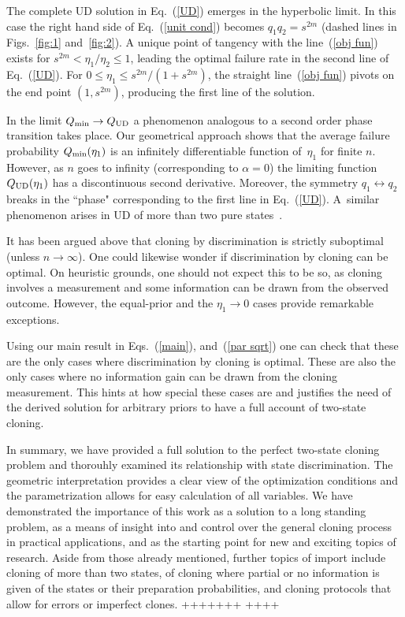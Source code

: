 \documentclass[aps,prl,twocolumn,showpacs]{revtex4}
\begin{document}
The complete UD solution in Eq.~(\ref{UD}) emerges in the hyperbolic limit. In this case the right hand side of Eq.~(\ref{unit cond}) becomes $q_1 q_2=s^{2m}$ (dashed lines in Figs.~\ref{fig:1} and~\ref{fig:2}).  A unique point of tangency with the line~(\ref{obj fun}) exists for $s^{2m}<\eta_1/\eta_2\le1$, leading the optimal failure rate in the second line of Eq.~(\ref{UD}).  For $0 \leq \eta_1 \leq s^{2m}/(1+s^{2m})$, the straight line~(\ref{obj fun}) pivots on the end point $(1,s^{2m})$, producing the first line of the solution.

In the limit  $Q_{\rm min} \to Q_{\rm UD}$ a phenomenon analogous to a second order phase transition takes place. Our geometrical approach shows that the average failure probability $Q_{\rm min}(\eta_1)$ is an infinitely differentiable function of~$\eta_1$ for finite $n$. However, as $n$ goes to infinity (corresponding to $\alpha=0$) the limiting function $Q_{\rm UD}(\eta_1)$ has a discontinuous second derivative. Moreover, the symmetry $q_1\leftrightarrow q_2$ breaks  in the ``phase" corresponding to the first line in Eq.~(\ref{UD}). A~similar phenomenon arises in UD of more than two pure states~\cite{Bergou1}.

It has been argued above that cloning by discrimination is strictly suboptimal (unless $n\to \infty$).
One could likewise wonder if discrimination by cloning can be optimal. On heuristic grounds, one should not expect this to be so, as cloning involves a measurement and some information can be drawn from the observed outcome. However, the equal-prior and the $\eta_1\to 0$ cases provide remarkable exceptions.

Using our main result in Eqs.~(\ref{main}), and~(\ref{par sqrt}) one can check that these are the only cases where discrimination by cloning is optimal. These are also the only cases where no information gain can be drawn from the cloning measurement.  This hints at how special these cases are and justifies the need of the derived solution for arbitrary priors to have a full account of two-state cloning. 

In summary, we have provided a full solution to the perfect two-state cloning problem and thorouhly examined its relationship with state discrimination.  The geometric interpretation provides a clear view of the optimization conditions and the parametrization allows for easy calculation of all variables.  We have demonstrated the importance of this work as a solution to a long standing problem, as a means of insight into and control over the general cloning process in practical applications, and as the starting point for new and exciting topics of research.  Aside from those already mentioned, further topics of import include cloning of more than two states, of cloning where partial or no information is given of the states or their preparation probabilities, and cloning protocols that allow for errors or imperfect clones.
+++++++
++++
\end{document}
